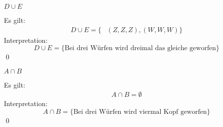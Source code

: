 \documentclass{abgabe}
\begin{document}
\begin{questions}
\begin{parts}
\begin{subparts}
            \newpage
            \subpart
            $D \cup E$
            \begin{solution}
                Es gilt:
                \[
                    \begin{aligned}
                        D \cup E =
                        \{
                         & (Z,Z,Z), (W,W,W)
                        \}
                    \end{aligned}
                \]
                Interpretation:
                \[
                    D \cup E = \{ \text{Bei drei Würfen wird dreimal das gleiche geworfen} \}
                \]
                \qed
            \end{solution}

            \subpart
            $A \cap B$
            \begin{solution}
                Es gilt:
                \[
                    \begin{aligned}
                        A \cap B =
                        \emptyset
                    \end{aligned}
                \]
                Interpretation:
                \[
                    A \cap B = \{ \text{Bei drei Würfen wird viermal Kopf geworfen} \}
                \]
                \qed
            \end{solution}
        \end{subparts}
    \end{parts}
\end{questions}
\end{document}
